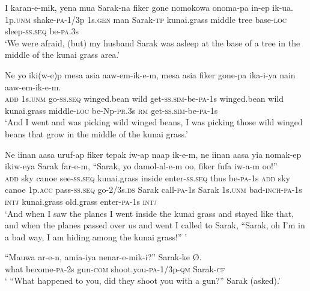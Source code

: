 \ea\label{ex:a:x77}
\gll  I  karan-e-mik,  yena  mua  Sarak-na  fiker  gone  nomokowa  onoma-pa  in-ep  ik-ua. \\
1p.\textsc{unm}  shake-\textsc{pa}-1/3p  1s.\textsc{gen}  man  Sarak-\textsc{tp}  kunai.grass middle  tree  base-\textsc{loc}  sleep-\textsc{ss.seq}  be-\textsc{pa}.3s \\
\glt ‘We were afraid, (but) my husband Sarak was asleep at the base of a tree in the middle of the kunai grass area.’ \\
\z


\ea\label{ex:a:x78}
\gll  Ne  yo  iki(w-e)p  mesa  asia  aaw-em-ik-e-m, mesa  asia  fiker  gone-pa  ika-i-ya  nain  aaw-em-ik-e-m. \\
\textsc{add}  1s.\textsc{unm}  go-\textsc{ss.seq}  winged.bean  wild  get-\textsc{ss}.\textsc{sim}-be-\textsc{pa}-1s winged.bean  wild  kunai.grass  middle-\textsc{loc}  be-Np-\textsc{pr}.3s  \textsc{rm} get-\textsc{ss}.\textsc{sim}-be-\textsc{pa}-1s\\ 
\glt ‘And I went and was picking wild winged beans, I was picking those wild winged beans that grow in the middle of the kunai grass.’ \\
\z


\ea\label{ex:a:x79}
\gll  Ne  iinan  aasa  uruf-ap  fiker  tepak  iw-ap naap  ik-e-m,  ne  iinan  aasa  yia  nomak-ep ikiw-eya  Sarak  far-e-m,  “Sarak,  yo  damol-al-e-m oo,  fiker  fufa  iw-a-m  oo!” \\
\textsc{add}  sky  canoe  see-\textsc{ss.seq}  kunai.grass  inside  enter-\textsc{ss.seq} thus  be-\textsc{pa}-1s  \textsc{add}  sky  canoe  1p.\textsc{acc}  pass-\textsc{ss.seq} go-2/3s.\textsc{ds}  Sarak  call-\textsc{pa}-1s  Sarak  1s.\textsc{unm}  bad-\textsc{inch}-\textsc{pa}-1s \textsc{intj}  kunai.grass  old.grass  enter-\textsc{pa}-1s  \textsc{intj} \\ 
\glt ‘And when I saw the planes I went inside the kunai grass and stayed like that, and when the planes passed over us and went I called to Sarak, “Sarak, oh I'm in a bad way, I am hiding among the kunai grass!” ’ \\
\z


\ea\label{ex:a:x80}
\gll  “Mauwa  ar-e-n,  amia-iya  nenar-e-mik-i?”  Sarak-ke  Ø. \\
what  become-\textsc{pa}-2s  gun-\textsc{com}  shoot.you-\textsc{pa}-1/3p-\textsc{qm} Sarak-\textsc{cf} \\ 
\glt ‘ “What happened to you, did they shoot you with a gun?” Sarak (asked).’ \\
\z


